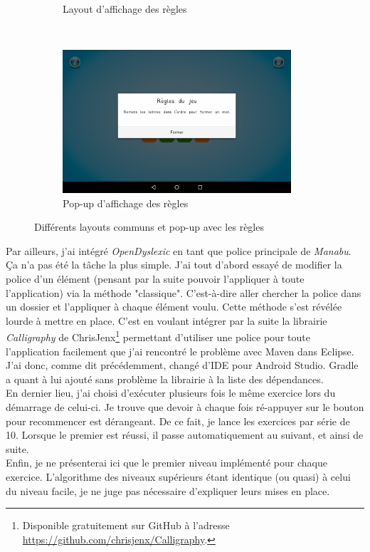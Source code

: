 \begin{figure}[H]
\begin{subfigure}[t]{8.5cm}
\caption{Layout d'affichage des règles}
\label{regles}
\end{subfigure}
~
\begin{subfigure}[t]{8.5cm}
\includegraphics[width=8.5cm]{img/popup.png}
\caption{Pop-up d'affichage des règles}
\label{popup}
\end{subfigure}
\caption{Différents layouts communs et pop-up avec les règles}
\end{figure}

Par ailleurs, j'ai intégré \textit{OpenDyslexic} en tant que police principale de \textit{Manabu}. Ça n'a pas été la tâche la plus simple. J'ai tout d'abord essayé de modifier la police d'un élément (pensant par la suite pouvoir l'appliquer à toute l'application) via la méthode "classique". C'est-à-dire aller chercher la police dans un dossier et l'appliquer à chaque élément voulu. Cette méthode s'est révélée lourde à mettre en place. C'est en voulant intégrer par la suite la librairie \textit{Calligraphy} de ChrisJenx\footnote{Disponible gratuitement sur GitHub à l'adresse \url{https://github.com/chrisjenx/Calligraphy}.} permettant d'utiliser une police pour toute l'application facilement que j'ai rencontré le problème avec Maven dans Eclipse. J'ai donc, comme dit précédemment, changé d'IDE pour Android Studio. Gradle a quant à lui ajouté sans problème la librairie à la liste des dépendances.\\

En dernier lieu, j'ai choisi d'exécuter plusieurs fois le même exercice lors du démarrage de celui-ci. Je trouve que devoir à chaque fois ré-appuyer sur le bouton pour recommencer est dérangeant. De ce fait, je lance les exercices par série de 10. Lorsque le premier est réussi, il passe automatiquement au suivant, et ainsi de suite.\\

Enfin, je ne présenterai ici que le premier niveau implémenté pour chaque exercice. L'algorithme des niveaux supérieurs étant identique (ou quasi) à celui du niveau facile, je ne juge pas nécessaire d'expliquer leurs mises en place.

